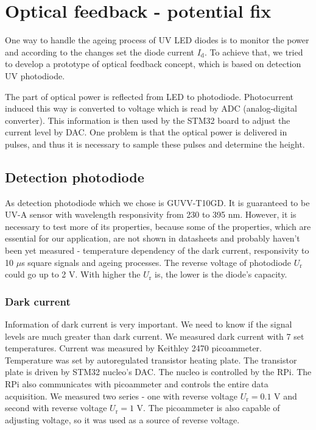 \section{Optical feedback - potential fix}
One way to handle the ageing process of UV LED diodes is to monitor the power and according to the changes set the diode current $I_\textrm{d}$. To achieve that, we tried to develop a prototype of optical feedback concept, which is based on detection UV photodiode. 
\par
The part of optical power is reflected from LED to photodiode. Photocurrent induced this way is converted to voltage which is read by ADC (analog-digital converter). This information is then used by the STM32 board to adjust the current level by DAC. One problem is that the optical power is delivered in pulses, and thus it is necessary to sample these pulses and determine the height.
\par
\subsection{Detection photodiode}
As detection photodiode which we chose is GUVV-T10GD. It is guaranteed to be UV-A sensor with wavelength responsivity from 230 to 395 nm. However, it is necessary to test more of its properties, because some of the properties, which are essential for our application, are not shown in datasheets and probably haven't been yet measured - temperature dependency of the dark current, responsivity to 10 $\mu$s square signals and ageing processes. The reverse voltage of photodiode $U_\textrm{r}$ could go up to 2 V. With higher the $U_\textrm{r}$ is, the lower is the diode's capacity.
\par
\subsubsection{Dark current}
Information of dark current is very important. We need to know if the signal levels are much greater than dark current. We measured dark current with 7 set temperatures. Current was measured by Keithley 2470 picoammeter. Temperature was set by autoregulated transistor heating plate. The transistor plate is driven by STM32 nucleo's DAC. The nucleo is controlled by the RPi. The RPi also communicates with picoammeter and controls the entire data acquisition. We measured two series - one with reverse voltage $U_\textrm{r} = 0.1$ V and second with reverse voltage $U_\textrm{r} = 1$ V. The picoammeter is also capable of adjusting voltage, so it was used as a source of reverse voltage.

